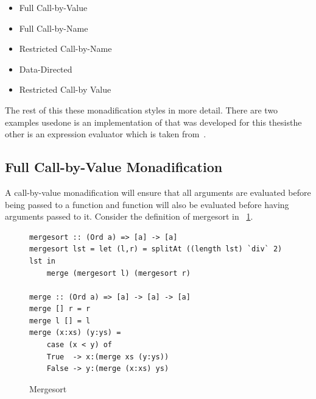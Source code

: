 \begin{itemize}
\item Full Call-by-Value
\item Full Call-by-Name
\item Restricted Call-by-Name
\item Data-Directed
\item Restricted Call-by Value \DIFaddbegin {}\DIFaddend \end{itemize}

The rest of this \DIFdelbegin {}\DIFdelend \DIFaddbegin {}\DIFaddend these monadification styles in more detail. There are two examples used\DIFdelbegin \DIFdel{, }\DIFdelend \DIFaddbegin \DIFadd{: }\DIFaddend one is an implementation of \DIFdelbegin {}\DIFdelend \DIFaddbegin {}\DIFaddend that was developed for this thesis\DIFaddbegin {}\DIFaddend the other is an expression evaluator which is taken from~\DIFdelbegin {}\DIFdelend \DIFaddbegin {}\DIFaddend . 

\subsection{Full Call-by-Value Monadification}

A call-by-value monadification \DIFaddbegin {}\DIFaddend will ensure that all arguments are evaluated before being passed to a function and \DIFdelbegin {}\DIFdelend \DIFaddbegin {}\DIFaddend function will also be evaluated before having arguments passed to it. Consider the definition of mergesort in \DIFdelbegin {}\DIFdelend \DIFaddbegin {}\DIFaddend ~\ref{mergesrt}.

\begin{figure}[t]
\begin{lstlisting}
mergesort :: (Ord a) => [a] -> [a]
mergesort lst = let (l,r) = splitAt ((length lst) `div` 2) lst in
	merge (mergesort l) (mergesort r)

merge :: (Ord a) => [a] -> [a] -> [a]
merge [] r = r
merge l [] = l
merge (x:xs) (y:ys) = 
	case (x < y) of
	True  -> x:(merge xs (y:ys))
	False -> y:(merge (x:xs) ys)						
\end{lstlisting}
\caption{Mergesort}
\label{mergesrt}
\end{figure}


